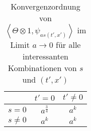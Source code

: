 \begin{table}[h]
\centering
\begin{tabular}{l|cc}
           & \multicolumn{1}{l}{$t'=0$} & \multicolumn{1}{l}{$t' \neq 0$} \\ \hline
$s = 0$    & $a^{\frac{3}{4}}$          & $a^k$                           \\
$s \neq 0$ & $a^k$                      & $a^k$
\end{tabular}
\caption{Konvergenzordnung von $\left<\Theta \otimes 1,\psi_{as(t',x')}\right>$ im Limit $a \rightarrow 0$ für alle interessanten Kombinationen von $s$ und $(t',x')$}
\label{tab:wavefront_set_heaviside}
\end{table}




